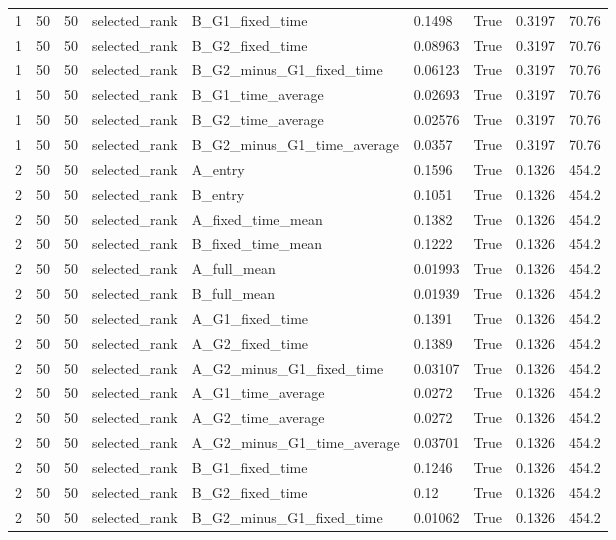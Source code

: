 \begin{longtable}{lllllllll}
1 & 50 & 50 & selected\_rank & B\_G1\_fixed\_time & 0.1498 & True & 0.3197 & 70.76 \\
1 & 50 & 50 & selected\_rank & B\_G2\_fixed\_time & 0.08963 & True & 0.3197 & 70.76 \\
1 & 50 & 50 & selected\_rank & B\_G2\_minus\_G1\_fixed\_time & 0.06123 & True & 0.3197 & 70.76 \\
1 & 50 & 50 & selected\_rank & B\_G1\_time\_average & 0.02693 & True & 0.3197 & 70.76 \\
1 & 50 & 50 & selected\_rank & B\_G2\_time\_average & 0.02576 & True & 0.3197 & 70.76 \\
1 & 50 & 50 & selected\_rank & B\_G2\_minus\_G1\_time\_average & 0.0357 & True & 0.3197 & 70.76 \\
2 & 50 & 50 & selected\_rank & A\_entry & 0.1596 & True & 0.1326 & 454.2 \\
2 & 50 & 50 & selected\_rank & B\_entry & 0.1051 & True & 0.1326 & 454.2 \\
2 & 50 & 50 & selected\_rank & A\_fixed\_time\_mean & 0.1382 & True & 0.1326 & 454.2 \\
2 & 50 & 50 & selected\_rank & B\_fixed\_time\_mean & 0.1222 & True & 0.1326 & 454.2 \\
2 & 50 & 50 & selected\_rank & A\_full\_mean & 0.01993 & True & 0.1326 & 454.2 \\
2 & 50 & 50 & selected\_rank & B\_full\_mean & 0.01939 & True & 0.1326 & 454.2 \\
2 & 50 & 50 & selected\_rank & A\_G1\_fixed\_time & 0.1391 & True & 0.1326 & 454.2 \\
2 & 50 & 50 & selected\_rank & A\_G2\_fixed\_time & 0.1389 & True & 0.1326 & 454.2 \\
2 & 50 & 50 & selected\_rank & A\_G2\_minus\_G1\_fixed\_time & 0.03107 & True & 0.1326 & 454.2 \\
2 & 50 & 50 & selected\_rank & A\_G1\_time\_average & 0.0272 & True & 0.1326 & 454.2 \\
2 & 50 & 50 & selected\_rank & A\_G2\_time\_average & 0.0272 & True & 0.1326 & 454.2 \\
2 & 50 & 50 & selected\_rank & A\_G2\_minus\_G1\_time\_average & 0.03701 & True & 0.1326 & 454.2 \\
2 & 50 & 50 & selected\_rank & B\_G1\_fixed\_time & 0.1246 & True & 0.1326 & 454.2 \\
2 & 50 & 50 & selected\_rank & B\_G2\_fixed\_time & 0.12 & True & 0.1326 & 454.2 \\
2 & 50 & 50 & selected\_rank & B\_G2\_minus\_G1\_fixed\_time & 0.01062 & True & 0.1326 & 454.2 \\

\end{longtable}
